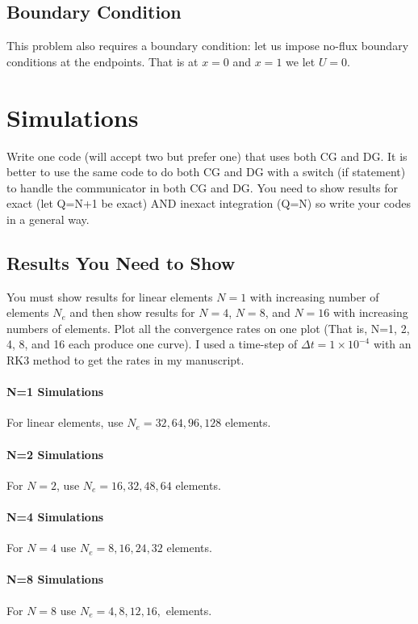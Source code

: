 \documentclass[10pt]{article}
\begin{document}
\subsection{Boundary Condition}
This problem also requires a boundary condition: let us impose no-flux
boundary conditions at the endpoints. That is at $x=0$ and $x=1$ we
let $U=0$.

\section{Simulations}

Write one code (will accept two but prefer one) that uses both CG and
DG.  
It is better to use the same code
to do both CG and DG with a switch (if statement) to handle the
communicator in both CG and DG.
You need to show results for exact (let Q=N+1 be exact) AND inexact integration (Q=N) so write your codes in a general way. 

\subsection{Results You Need to Show}
You must show results for linear elements $N=1$ with increasing number of elements $N_e$ and then show results for 
$N=4$, $N=8$, and $N=16$ with increasing numbers of elements. Plot all
the convergence rates on one plot (That is, N=1, 2, 4, 8, and 16 each
produce one curve).
I used a time-step of $\Delta t=1 \times 10^{-4}$ with an RK3 method
to get the rates in my manuscript.

\paragraph{N=1 Simulations}
For linear elements, use $N_e=32, 64, 96, 128$ elements.

\paragraph{N=2 Simulations}
For $N=2$, use $N_e=16, 32, 48, 64$ elements.

\paragraph{N=4 Simulations}
For $N=4$ use $N_e=8,16,24,32$ elements.

\paragraph{N=8 Simulations}
For $N=8$ use $N_e=4,8,12,16,$ elements.
\end{document}
